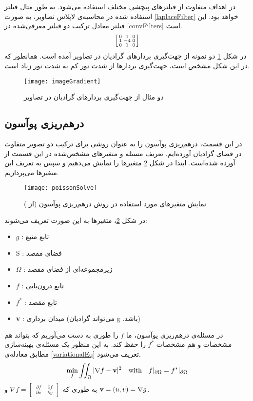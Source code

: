 در اهداف متفاوت از فیلتر‌های پیچشی مختلف استفاده می‌شود. به طور مثال فیلتر استفاده شده در محاسبه‌ی لاپلاس تصاویر، به صورت \ref{laplaceFilter} خواهد بود. این فیلتر معادل ترکیب دو فیلتر معرفی‌شده در \ref{convFilters} است.
\begin{equation} \label{laplaceFilter}
	\begin{bsmallmatrix}
		0 & 1 & 0 \\
		1 & -4 & 0 \\
		0 & 1 & 0 \\
	\end{bsmallmatrix}
\end{equation}
 در شکل \ref{gradImgEx} دو نمونه از جهت‌گیری بردارهای گرادیان در تصاویر آمده است. همانطور که در این شکل مشخص است، جهت‌گیری بردار‌ها از شدت نور کم به شدت نور زیاد است.
\begin{figure}[h!]
	\centering
	\texttt{[image: imageGradient]}
	\caption{دو مثال از جهت‌گیری بردار‌های گرادیان در تصاویر}
	\label{gradImgEx}
\end{figure}
\subsection{در‌هم‌ریزی پوآسون}
در این قسمت، در‌هم‌ریزی پوآسون را به عنوان روشی برای ترکیب دو تصویر متفاوت در فضای گرادیان آورده‌ایم. تعریف مسئله و متغیر‌های مشخص‌شده در این قسمت از \cite{PoissonImageEditing} آورده شده‌است. ابتدا در شکل \ref{poissonSolve} متغیر‌ها را نمایش می‌دهیم و سپس به تعریف این متغیرها می‌پردازیم.
\begin{figure}[h!]
	\centering
	\texttt{[image: poissonSolve]}
	\caption{نمایش متغیر‌های مورد استفاده در روش درهم‌ریزی پوآسون (از \cite{PoissonImageEditing})}
	\label{poissonSolve}
\end{figure}
در شکل \ref{poissonSolve}، متغیرها به این صورت تعریف می‌شوند:
\begin{itemize}
	\item 
	$g$ : تابع منبع
	\item 
	S : فضای مقصد
	\item 
	$\Omega$ : زیرمجموعه‌ای از فضای مقصد
	\item 
	$f$ : تابع درون‌یابی
	\item
	$f^*$ : تابع مقصد
	\item 
	\textbf{v} : میدان برداری (می‌تواند گرادیان g .باشد)
\end{itemize}
در مسئله‌ی درهم‌ریزی پوآسون، ما $f$ را طوری به دست می‌آوریم که بتواند هم مشخصات  و هم مشخصات $f^*$ را حفظ کند. به این منظور یک مسئله‌ی بهینه‌سازی مطابق معادله‌ی \ref{variationalEq} تعریف می‌شود.
\begin{equation} \label{variationalEq}
	\min_f \iint_\Omega |\nabla f - \text{\textbf{v}} |^2 \quad \textrm{with} \quad f|_{\partial \Omega} = f^*|_{\partial \Omega} 
\end{equation}
به طوری که 
$\nabla f = \begin{bmatrix} \frac{\partial f}{\partial x} &  \frac{\partial f}{\partial y}\end{bmatrix}$ 
و 
$\text{\textbf{v}} = (u,v) = \nabla g$.

